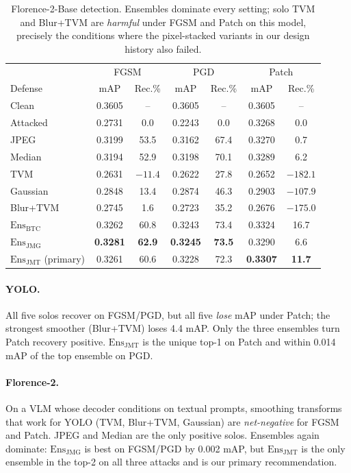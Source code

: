 \documentclass[10pt,twocolumn,letterpaper]{article}
\newcommand{\best}[1]{\textbf{#1}}
\begin{document}
\begin{table}[t]
\centering
\small
\setlength{\tabcolsep}{4.5pt}
\begin{tabular}{l|cc|cc|cc}
\toprule
 & \multicolumn{2}{c|}{FGSM} & \multicolumn{2}{c|}{PGD} & \multicolumn{2}{c}{Patch} \\
Defense & mAP & Rec.\% & mAP & Rec.\% & mAP & Rec.\% \\
\midrule
Clean     & 0.3605 &  --   & 0.3605 &  --   & 0.3605 &  --  \\
Attacked  & 0.2731 &  0.0  & 0.2243 &  0.0  & 0.3268 &  0.0 \\
\midrule
JPEG       & 0.3199 & 53.5 & 0.3162 & 67.4 & 0.3270 & 0.7  \\
Median     & 0.3194 & 52.9 & 0.3198 & 70.1 & 0.3289 & 6.2  \\
TVM        & 0.2631 & $-11.4$ & 0.2622 & 27.8 & 0.2652 & $-182.1$ \\
Gaussian   & 0.2848 & 13.4 & 0.2874 & 46.3 & 0.2903 & $-107.9$ \\
Blur+TVM   & 0.2745 & 1.6  & 0.2723 & 35.2 & 0.2676 & $-175.0$ \\
\midrule
$\mathrm{Ens}_{\text{BTC}}$           & 0.3262 & 60.8 & 0.3243 & 73.4 & 0.3324 & 16.7 \\
$\mathrm{Ens}_{\text{JMG}}$           & \best{0.3281} & \best{62.9} & \best{0.3245} & \best{73.5} & 0.3290 & 6.6  \\
$\mathrm{Ens}_{\text{JMT}}$ (primary) & 0.3261 & 60.6 & 0.3228 & 72.3 & \best{0.3307} & \best{11.7} \\
\bottomrule
\end{tabular}
\caption{Florence-2-Base detection. Ensembles dominate every setting; solo TVM and Blur+TVM are \emph{harmful} under FGSM and Patch on this model, precisely the conditions where the pixel-stacked variants in our design history also failed.}
\label{tab:florence_results}
\end{table}

\paragraph{YOLO.} All five solos recover on FGSM/PGD, but all five \emph{lose} mAP under Patch; the strongest smoother (Blur+TVM) loses 4.4 mAP. Only the three ensembles turn Patch recovery positive. $\mathrm{Ens}_{\text{JMT}}$ is the unique top-1 on Patch and within 0.014 mAP of the top ensemble on PGD.

\paragraph{Florence-2.} On a VLM whose decoder conditions on textual prompts, smoothing transforms that work for YOLO (TVM, Blur+TVM, Gaussian) are \emph{net-negative} for FGSM and Patch. JPEG and Median are the only positive solos. Ensembles again dominate: $\mathrm{Ens}_{\text{JMG}}$ is best on FGSM/PGD by 0.002 mAP, but $\mathrm{Ens}_{\text{JMT}}$ is the only ensemble in the top-2 on all three attacks and is our primary recommendation.
\end{document}

